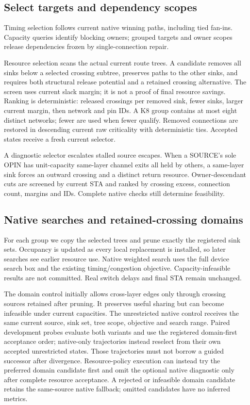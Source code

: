 \documentclass[conference,10pt]{IEEEtran}
\begin{document}
\subsection{Select targets and dependency scopes}
Timing selection follows current native winning paths, including tied fan-ins. Capacity queries identify blocking owners; grouped targets and owner scopes release dependencies frozen by single-connection repair.

Resource selection scans the actual current route trees. A candidate removes all sinks below a selected crossing subtree, preserves paths to the other sinks, and requires both structural release potential and a retained crossing alternative. The screen uses current slack margin; it is not a proof of final resource savings. Ranking is deterministic: released crossings per removed sink, fewer sinks, larger current margin, then network and pin IDs. A K8 group contains at most eight distinct networks; fewer are used when fewer qualify. Removed connections are restored in descending current raw criticality with deterministic ties. Accepted states receive a fresh current selector.

A diagnostic selector escalates stalled source escapes. When a SOURCE's sole OPIN has unit-capacity same-layer channel exits all held by others, a same-layer sink forces an outward crossing and a distinct return resource. Owner-descendant cuts are screened by current STA and ranked by crossing excess, connection count, margins and IDs. Complete native checks still determine feasibility.

\subsection{Native searches and retained-crossing domains}
For each group we copy the selected trees and prune exactly the registered sink sets. Occupancy is updated as every local replacement is installed, so later searches see earlier resource use. Native weighted search uses the full device search box and the existing timing/congestion objective. Capacity-infeasible results are not committed. Real switch delays and final STA remain unchanged.

The domain control initially allows cross-layer edges only through crossing sources retained after pruning. It preserves useful sharing but can become infeasible under current capacities. The unrestricted native control receives the same current source, sink set, tree scope, objective and search range. Paired development probes evaluate both variants and use the registered domain-first acceptance order; native-only trajectories instead reselect from their own accepted unrestricted states. Those trajectories must not borrow a guided successor after divergence. Resource-policy execution can instead try the preferred domain candidate first and omit the optional native diagnostic only after complete resource acceptance. A rejected or infeasible domain candidate retains the same-source native fallback; omitted candidates have no inferred metrics.
\end{document}
